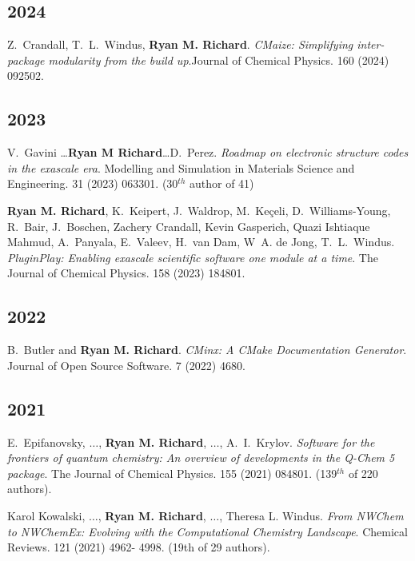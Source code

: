 \documentclass[11pt,a4paper,sans]{moderncv}
\begin{document}
\vspace{5pt}
\begin{etaremune}
\item[]{}
	\subsection{2024}
	\item{Z.~Crandall, T.~L.~Windus, \textbf{Ryan M. Richard}. 
	      \textit{CMaize: Simplifying inter-package modularity from the build 
		  up}.Journal of Chemical Physics. 160 (2024) 092502.}

	\subsection{2023}
	\item{V.~Gavini \ldots \textbf{Ryan M Richard}\ldots D.~Perez.
	      \textit{Roadmap on electronic structure codes in the exascale era}.
		  Modelling and Simulation in Materials Science and Engineering. 31
		  (2023) 063301. (30$^{th}$ author of 41)
	}
	\item{\textbf{Ryan M. Richard}, K.~Keipert, J.~Waldrop,
	      M.~Keçeli, D.~Williams-Young, R.~Bair, J.~Boschen,
		  Zachery Crandall, Kevin Gasperich, Quazi Ishtiaque Mahmud,
		  A.~Panyala, E.~Valeev, H.~van Dam, W~A. de Jong,
		  T.~L.~Windus. \textit{PluginPlay: Enabling exascale scientific
		  software one module at a time}. The Journal of Chemical Physics. 158
		  (2023) 184801.
	}

	\subsection{2022}
	\item{B.~Butler and \textbf{Ryan M. Richard}. \textit{CMinx: A CMake
	      Documentation Generator}. Journal of Open Source Software. 7 (2022)
		  4680.
	}

	\subsection{2021}
	\item{E.~Epifanovsky, $\ldots$, \textbf{Ryan M. Richard}, $\ldots$,
	      A.~I.~Krylov. \textit{Software for the frontiers of quantum 
		  chemistry: An overview of developments in the Q-Chem 5 package}. The 
		  Journal of Chemical Physics. 155 (2021) 084801. (139$^{th}$ of 220 
		  authors).}
	\item{Karol Kowalski, $\ldots$, \textbf{Ryan M. Richard}, $\ldots$, Theresa 
	      L. Windus. \textit{From NWChem to NWChemEx: Evolving with the 
		  Computational Chemistry Landscape}. Chemical Reviews. 121 (2021) 4962-
		  4998. (19th of 29 authors).}
	

\end{etaremune}
\end{document}
